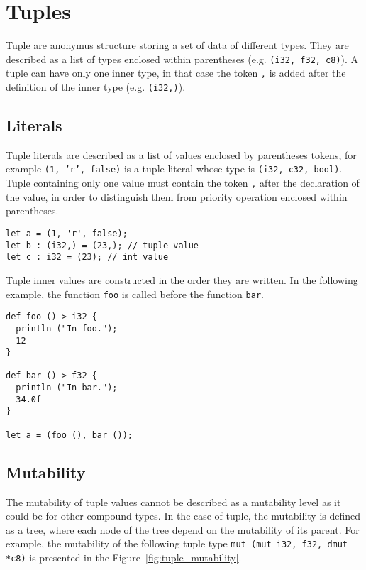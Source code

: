 \section {Tuples}


Tuple are anonymus structure storing a set of data of different types. They are
described as a list of types enclosed within parentheses (e.g. \texttt{(i32,
  f32, c8)}). A tuple can have only one inner type, in that case the token
\texttt{,} is added after the definition of the inner type (e.g.
\texttt{(i32,)}).

\subsection {Literals}

Tuple literals are described as a list of values enclosed by parentheses tokens,
for example \texttt{(1, 'r', false)} is a tuple literal whose type is
\texttt{(i32, c32, bool)}. Tuple containing only one value must contain the
token \texttt{,} after the declaration of the value, in order to distinguish
them from priority operation enclosed within parentheses.

\begin{lstlisting}[style=coloredverbatim]
let a = (1, 'r', false);
let b : (i32,) = (23,); // tuple value
let c : i32 = (23); // int value
\end{lstlisting}

\noindent Tuple inner values are constructed in the order they are written. In the
following example, the function \texttt{foo} is called before the function
\texttt{bar}.

\begin{lstlisting}[style=coloredverbatim]
def foo ()-> i32 {
  println ("In foo.");
  12
}

def bar ()-> f32 {
  println ("In bar.");
  34.0f
}

let a = (foo (), bar ());
\end{lstlisting}

\subsection {Mutability}
\label{sec:tuple_mutability}

The mutability of tuple values cannot be described as a mutability level as it
could be for other compound types. In the case of tuple, the mutability is
defined as a tree, where each node of the tree depend on the mutability of its
parent. For example, the mutability of the following tuple type \texttt{mut (mut
  i32, f32, dmut *c8)} is presented in the Figure~\ref{fig:tuple_mutability}.

